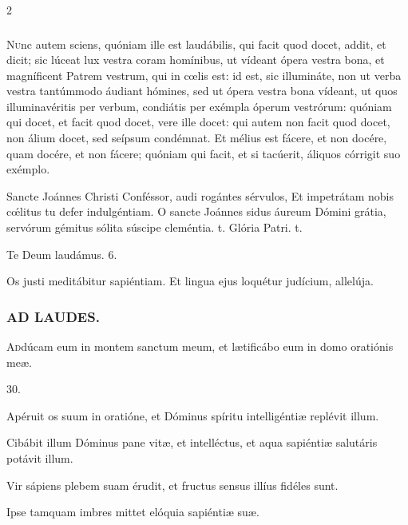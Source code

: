 \documentclass[9pt,twoside]{extarticle}
\begin{document}
\begin{multicols}{2}
\subsubsection*{\center{}}
\lettrine{N}unc autem sciens, quóniam ille est laudábilis, qui facit quod docet, addit, et dicit; sic lúceat lux vestra coram homínibus, ut vídeant ópera vestra bona, et magníficent Patrem vestrum, qui in cœlis est: id est, sic illumináte, non ut verba vestra tantúmmodo áudiant hómines, sed ut ópera vestra bona vídeant, ut quos illuminavéritis per verbum, condiátis per exémpla óperum vestrórum: quóniam qui docet, et facit quod docet, vere ille docet: qui autem non facit quod docet, non álium docet, sed seípsum condémnat. Et mélius est fácere, et non docére, quam docére, et non fácere; quóniam qui facit, et si tacúerit, áliquos córrigit suo exémplo.\\

\begin{tightlist}{}
\item {} Sancte Joánnes Christi Conféssor, audi rogántes sérvulos, \textred{*} Et impetrátam nobis cœ́litus tu defer indulgéntiam.  O sancte Joánnes sidus áureum Dómini grátia, servórum gémitus sólita súscipe cleméntia. t. Glória Patri. t.
\item Te Deum laudámus. 6. 
\item {} Os justi meditábitur sapiéntiam.  Et lingua ejus loquétur judícium, allelúja.
\end{tightlist}

\subsubsection*{\center \textsc{AD LAUDES.}}
\begin{center}\end{center}
\lettrine{A}ddúcam eum in montem sanctum meum, et lætificábo eum in domo oratiónis meæ.

\begin{tightlist}{}
\item {} 30.
\item {} Apéruit os suum in oratióne, et Dóminus spíritu intelligéntiæ replévit illum.
\item {} Cibábit illum Dóminus pane vitæ, et intelléctus, et aqua sapiéntiæ salutáris potávit illum.
\item {} Vir sápiens plebem suam érudit, et fructus sensus illíus fidéles sunt.
\item {} Ipse tamquam imbres mittet elóquia sapiéntiæ suæ.
\end{tightlist}


\end{multicols}
\end{document}
